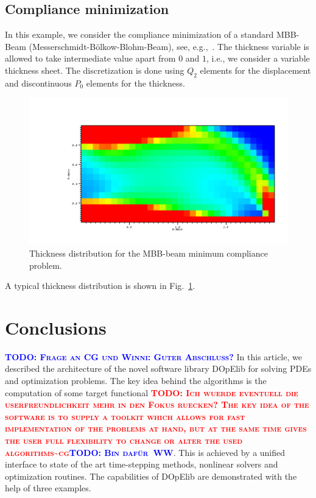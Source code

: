 \documentclass[smallextended]{svjour3}       %
\numberwithin{equation}{section}
\newcommand{\todo}[1]{\textbf{\textsc{\textcolor{blue}{TODO: #1}}}}
\newcommand{\todocg}[1]{\textbf{\textsc{\textcolor{red}{TODO: #1\textasciitilde cg}}}}
\begin{document}
\subsection{Compliance minimization}
In this example, we consider the compliance minimization of a standard MBB-Beam (Messerschmidt-B\"olkow-Blohm-Beam), see, e.g.,~\cite{BendsoeSigmund:2003}.
The thickness variable is allowed to take intermediate value apart from $0$ and $1$,
i.e., we consider a variable thickness sheet. The discretization is done 
using $Q_2$ elements for the displacement and discontinuous $P_0$ elements for the 
thickness.
\begin{figure}
\centering
\includegraphics[width=1.\textwidth, viewport=205 88 975 500, clip]{Pictures/MBB.png}
\caption{Thickness distribution for the MBB-beam minimum compliance problem.} 
\label{res:mbb}
\end{figure}
A typical thickness distribution is shown in Fig.~\ref{res:mbb}.

\section{Conclusions}
\todo{Frage an CG und Winni: Guter Abschluss?}
In this article, we described the architecture 
of the novel software library DOpElib for solving 
PDEs and optimization problems.  The key idea behind 
the algorithms is the computation of some target 
functional \todocg{Ich wuerde eventuell die userfreundlichkeit mehr in den Fokus ruecken? The key idea of the software is to supply a toolkit which allows for fast implementation of the problems at hand, but at the same time gives the user full flexibility to change or alter the used algorithms}\todo{Bin daf\"ur~WW}. This is achieved by a unified interface 
to state of the art time-stepping methods, nonlinear solvers and optimization
routines. The capabilities of DOpElib are demonstrated with the help of three examples.
\end{document}
